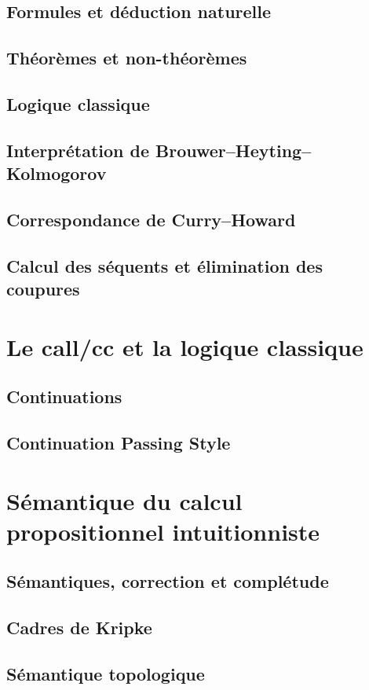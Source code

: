 \subsection{Formules et déduction naturelle}
\subsection{Théorèmes et non-théorèmes}
\subsection{Logique classique}
\subsection{Interprétation de Brouwer--Heyting--Kolmogorov}
\subsection{Correspondance de Curry--Howard}
\subsection{Calcul des séquents et élimination des coupures}

\section{Le call/cc et la logique classique}
\subsection{Continuations}
\subsection{Continuation Passing Style}

\section{Sémantique du calcul propositionnel intuitionniste}
\subsection{Sémantiques, correction et complétude}
\subsection{Cadres de Kripke}
\subsection{Sémantique topologique}
